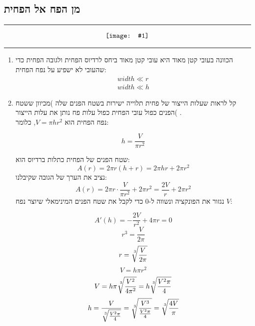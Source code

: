 \documentclass{article}
\newcommand{\image}[2]{
    \begin{align*}
        \centering
        \texttt{[image: \#1]}
    \end{align*}
}
\newcommand{\qimage}[2]{
    \hrule
    \image{#1}{#2}
    \hrule
    \vspace{8pt}
}
\begin{document}
\newpage
\subsection*{מן הפח אל הפחית}
\qimage{images/questions_screenshots/Screenshot 2023-10-16 180406.png}{0.5}

\begin{enumerate}
  \item הכוונה בעובי קטן מאוד היא עובי קטן מאוד ביחס לרדיוס הפחית ולגובה הפחית כדי שהעובי לא ישפיע על נפח הפחית:
  \begin{align*}
      width \ll r \\
      width \ll h
  \end{align*}
    



  \item קל לראות שעלות הייצור של פחית תלוייה ישירות בשטח הפנים שלה )מכיוון ששטח הפנים כפול עובי הפחית כפול עלות פח נותן את עלות הייצור( .\\
  נפח הפחית הוא $V = \pi h r^2$,
  כלומר:

  \begin{equation*}
      h = \frac{V}{\pi r^2}
  \end{equation*}

  שטח הפנים של הפחית כתלות ברדיוס הוא: 
  \begin{equation*}
      A(r) =  2\pi r\left( h+r \right) = 2\pi hr + 2\pi r^2
  \end{equation*}
  נציב את הערך של הגובה שקיבלנו:
    \begin{equation*}
      A(r) =  2\pi r \cdot \frac{V}{\pi r^2} + 2\pi r^2 = \frac{2V}{r} +2\pi r^2
    \end{equation*}
  נגזור את הפונקציה ונשווה ל-0 כדי לקבל את שטח הפנים המינימאלי שיוצר נפח $V$:

  \begin{equation*}
    A'(h) = -\frac{2V}{r^2} + 4\pi r = 0
  \end{equation*}
  \begin{equation*}
      r^3 = \frac{V}{2\pi}
  \end{equation*}
  \begin{equation*}
      r = \sqrt[\leftroot{-2}\uproot{2}3]{\frac{V}{2\pi}}
  \end{equation*}
    \begin{equation*}
      V = h\pi r^2
  \end{equation*}
  \begin{equation*}
      V = h\pi\sqrt[\leftroot{-2}\uproot{2}3]{\frac{V^2}{4\pi^2}} = h\sqrt[\leftroot{-2}\uproot{2}3]{\frac{V^2\pi}{4}}
  \end{equation*}
    \begin{equation*}
        h = \frac{V}{\sqrt[\leftroot{-2}\uproot{2}3]{\frac{V^2\pi}{4}}}
        = \sqrt[\leftroot{-2}\uproot{2}3]{\frac{V^3}{\frac{V^2\pi}{4}}}
        = \sqrt[\leftroot{-2}\uproot{2}3]{\frac{4V}{\pi}}
    \end{equation*}


\end{enumerate}
\end{document}
